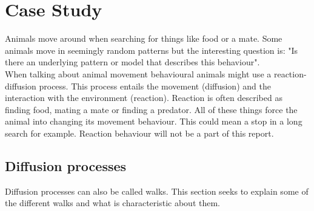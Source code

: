 \chapter{Case Study}
Animals move around when searching for things like food or a mate. Some animals move in seemingly random patterns but the interesting question is: "Is there an underlying pattern or model that describes this behaviour".\\
When talking about animal movement behavioural animals might use a reaction-diffusion process. This process entails the movement (diffusion) and the interaction with the environment (reaction). Reaction is often described as finding food, mating a mate or finding a predator. All of these things force the animal into changing its movement behaviour. This could mean a stop in a long search for example. Reaction behaviour will not be a part of this report.

\section{Diffusion processes}
Diffusion processes can also be called walks. This section seeks to explain some of the different walks and what is characteristic about them.

